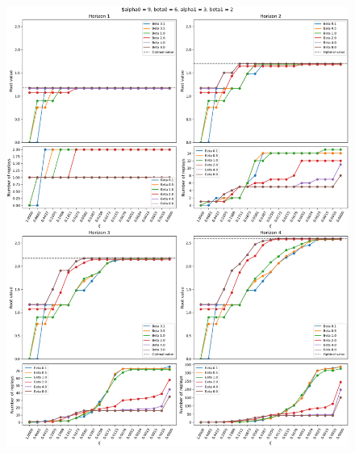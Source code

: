 \documentclass{article}
\begin{document}
\begin{figure}[ht!]
    \centering
    \includegraphics[width=1\textwidth]{../../../../bandit/data/convergence/xi/alpha09_beta06_alpha13_beta12_complete.png}
\end{figure}
\end{document}
